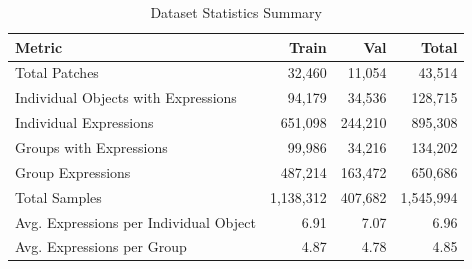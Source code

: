 \begin{table}[H]
\centering
\caption{Dataset Statistics Summary}
\label{tab:dataset_stats}
\begin{tabular}{@{}lrrr@{}}
\toprule
\textbf{Metric} & \textbf{Train} & \textbf{Val} & \textbf{Total} \\
\midrule
Total Patches & 32,460 & 11,054 & 43,514 \\
Individual Objects with Expressions & 94,179 & 34,536 & 128,715 \\
Individual Expressions & 651,098 & 244,210 & 895,308 \\
Groups with Expressions & 99,986 & 34,216 & 134,202 \\
Group Expressions & 487,214 & 163,472 & 650,686 \\
Total Samples & 1,138,312 & 407,682 & 1,545,994 \\
Avg. Expressions per Individual Object & 6.91 & 7.07 & 6.96 \\
Avg. Expressions per Group & 4.87 & 4.78 & 4.85 \\
\bottomrule
\end{tabular}
\end{table}

